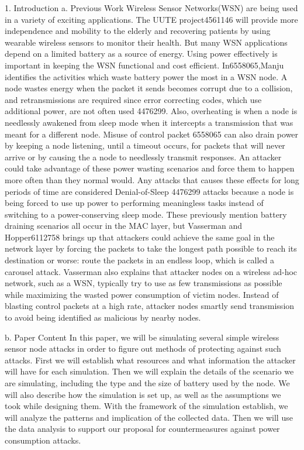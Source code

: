1. Introduction
a. Previous Work
	Wireless Sensor Networks(WSN) are being used in a variety of exciting applications. The UUTE project{4561146} will provide more independence and mobility to the elderly and recovering patients by using wearable wireless sensors to monitor their health. But many WSN applications depend on a limited battery as a source of energy.  Using power effectively is important in keeping the WSN functional and cost efficient. In{6558065},Manju identifies the activities which waste battery power the most in a WSN node.  A node wastes energy when the packet it sends becomes corrupt due to a collision, and retransmissions are required since error correcting codes, which use additional power, are not often used {4476299}. Also, overheating is when a node is needlessly awakened from sleep mode when it intercepts a transmission that was meant for a different node.  Misuse of control packet {6558065} can also drain power by keeping a node listening, until a timeout occurs, for packets that will never arrive or by causing the a node to needlessly transmit responses.
	An attacker could take advantage of these power wasting scenarios and force them to happen more often than they normal would.  Any attacks that causes these effects for long periods of time are considered Denial-of-Sleep {4476299} attacks because a node is being forced to use up power to performing meaningless tasks instead of switching to a power-conserving sleep mode.
 These previously mention battery draining scenarios all occur in the MAC layer, but Vasserman and Hopper{6112758} brings up that attackers could achieve the same goal in the network layer by forcing the packets to take the longest path possible to reach its destination or worse: route the packets in an endless loop, which is called a carousel attack.  Vasserman also explains that attacker nodes on a wireless ad-hoc network, such as a WSN, typically try to use as few transmissions as possible while maximizing the wasted power consumption of victim nodes. Instead of blasting control packets at a high rate, attacker nodes smartly send transmission to avoid being identified as malicious by nearby nodes.

b. Paper Content
In this paper, we will be simulating several simple wireless sensor node attacks in order to figure out methods of protecting against such attacks. First we will establish what resources and what information  the attacker will have for each simulation. Then we will explain the details of the scenario we are simulating, including the type and the size of battery  used by the node. We will also describe how the simulation is set up, as well as the assumptions we took while designing them. With the framework of the simulation establish, we will analyze the patterns and implication of the collected data. Then we will use the data analysis to support our proposal for countermeasures against power consumption attacks.

